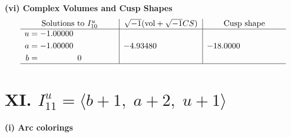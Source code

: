 \documentclass[1p]{elsarticle_modified}
\theoremstyle{definition}
\newcommand{\I}{\sqrt{-1}}
\begin{document}
\newpage\flushleft \textbf{(vi) Complex Volumes and Cusp Shapes}
$$\begin{array}{c|c|c}  
\text{Solutions to }I^u_{10}& \I (\text{vol} + \sqrt{-1}CS) & \text{Cusp shape}\\
 \hline 
\begin{aligned}
u &= -1.00000\phantom{ +0.000000I} \\
a &= -1.00000\phantom{ +0.000000I} \\
b &= \phantom{-0.000000 } 0\end{aligned}
 & -4.93480\phantom{ +0.000000I} & -18.0000\phantom{ +0.000000I}\\
 \hline 
 \end{array}$$\newpage\newpage\renewcommand{\arraystretch}{1}
\centering \section*{XI. $I^u_{11}= \langle b+1,\;a+2,\;u+1 \rangle$}
\flushleft \textbf{(i) Arc colorings}\\
\end{document}
